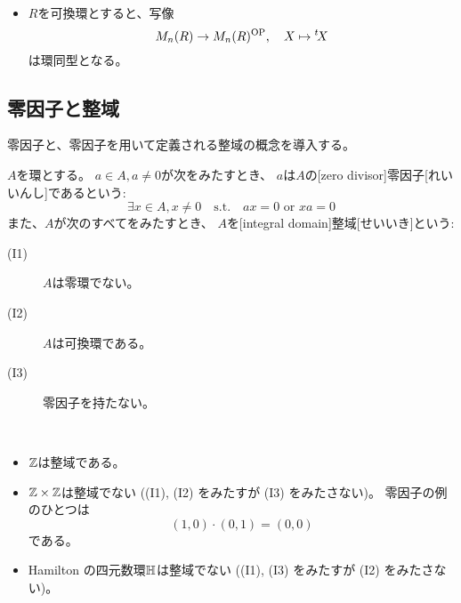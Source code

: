 \documentclass[report]{jlreq}
\begin{document}
\begin{example}[反転環の例]
    ~
    \begin{itemize}
        \item $R$を可換環とすると、写像
            \begin{equation}
                M_n(R) \to M_n(R)^{\mathrm{OP}},
                \quad X \mapsto {}^t\!X
            \end{equation}
            は環同型となる。
    \end{itemize}
\end{example}

\subsection{零因子と整域}

零因子と、零因子を用いて定義される整域の概念を導入する。

\begin{definition}[零因子と整域]
    $A$を環とする。
    $a \in A, a \neq 0$が次をみたすとき、
    $a$は$A$の[zero divisor]{零因子}[れいいんし]であるという:
    \begin{equation}
        \exists x \in A, x \neq 0
        \quad \text{s.t.} \quad
        ax = 0 \text{ or } xa = 0
    \end{equation}
    また、$A$が次のすべてをみたすとき、
    $A$を[integral domain]{整域}[せいいき]という:
    \begin{description}
        \item[(I1)] $A$は零環でない。
        \item[(I2)] $A$は可換環である。
        \item[(I3)] 零因子を持たない。
    \end{description}
\end{definition}

\begin{example}[零因子と整域の例]
    ~
    \begin{itemize}
        \item $\mathbb{Z}$は整域である。
        \item $\mathbb{Z} \times \mathbb{Z}$は整域でない ((I1), (I2) をみたすが (I3) をみたさない)。
            零因子の例のひとつは
            \begin{equation}
                (1, 0) \cdot (0, 1) = (0, 0)
            \end{equation}
            である。
        \item Hamilton の四元数環$\mathbb{H}$は整域でない ((I1), (I3) をみたすが (I2) をみたさない)。
    \end{itemize}
\end{example}
\end{document}
